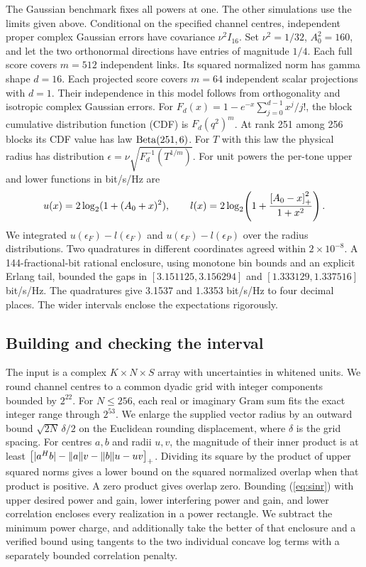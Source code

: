 The Gaussian benchmark fixes all powers at one. The other simulations use the limits given above. Conditional on the specified channel centres, independent proper complex Gaussian errors have covariance \(\nu^2 I_{16}\). Set \(\nu^2=1/32\), \(A_0^2=160\), and let the two orthonormal directions have entries of magnitude \(1/4\). Each full score covers \(m=512\) independent links. Its squared normalized norm has gamma shape \(d=16\). Each projected score covers \(m=64\) independent scalar projections with \(d=1\). Their independence in this model follows from orthogonality and isotropic complex Gaussian errors. For \(F_d(x)=1-e^{-x}\sum_{j=0}^{d-1}x^j/j!\), the block cumulative distribution function (CDF) is \(F_d(q^2)^m\). At rank 251 among 256 blocks its CDF value has law \({\rm Beta}(251,6)\). For \(T\) with this law the physical radius has distribution \(\epsilon=\nu\sqrt{F_d^{-1}(T^{1/m})}\). For unit powers the per-tone upper and lower functions in bit/s/Hz are
\[
 u(x)=2\log_2(1+(A_0+x)^2),\qquad
 l(x)=2\log_2\!\left(1+\frac{\left[A_0-x\right]_{+}^2}{1+x^2}\right).
\]
We integrated \(u(\epsilon_F)-l(\epsilon_F)\) and \(u(\epsilon_F)-l(\epsilon_P)\) over the radius distributions. Two quadratures in different coordinates agreed within \(2\times10^{-8}\). A 144-fractional-bit rational enclosure, using monotone bin bounds and an explicit Erlang tail, bounded the gaps in \([3.151125,3.156294]\) and \([1.333129,1.337516]\) bit/s/Hz. The quadratures give 3.1537 and 1.3353 bit/s/Hz to four decimal places. The wider intervals enclose the expectations rigorously.

\subsection*{Building and checking the interval}
The input is a complex \(K\times N\times S\) array with uncertainties in whitened units. We round channel centres to a common dyadic grid with integer components bounded by \(2^{22}\). For \(N\leq256\), each real or imaginary Gram sum fits the exact integer range through \(2^{53}\). We enlarge the supplied vector radius by an outward bound \(\sqrt{2N}\,\delta/2\) on the Euclidean rounding displacement, where \(\delta\) is the grid spacing. For centres \(a,b\) and radii \(u,v\), the magnitude of their inner product is at least \(\left[|a^Hb|-\|a\|v-\|b\|u-uv\right]_{+}\). Dividing its square by the product of upper squared norms gives a lower bound on the squared normalized overlap when that product is positive. A zero product gives overlap zero. Bounding (\ref{eq:sinr}) with upper desired power and gain, lower interfering power and gain, and lower correlation encloses every realization in a power rectangle. We subtract the minimum power charge, and additionally take the better of that enclosure and a verified bound using tangents to the two individual concave log terms with a separately bounded correlation penalty.

